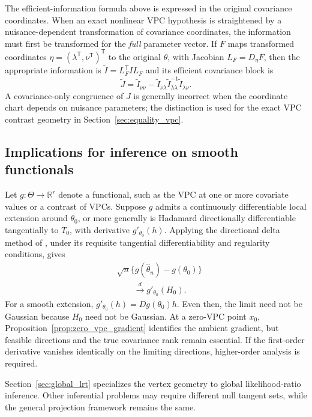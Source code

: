 The efficient-information formula above is expressed in the original
covariance coordinates. When an exact nonlinear VPC hypothesis is
straightened by a nuisance-dependent transformation of covariance
coordinates, the information must first be transformed for the
\emph{full} parameter vector. If $F$ maps transformed coordinates
$\eta=(\lambda^{\mathsf T},\nu^{\mathsf T})^{\mathsf T}$ to the
original $\theta$, with Jacobian $L_F=D_\eta F$, then the appropriate
information is $\widetilde I=L_F^{\mathsf T}I L_F$ and its efficient
covariance block is
\begin{equation}\label{eq:sec4-transformed-efficient-information}
\widetilde J=\widetilde I_{\nu\nu}
-\widetilde I_{\nu\lambda}
 \widetilde I_{\lambda\lambda}^{-1}
 \widetilde I_{\lambda\nu}.
\end{equation}
A covariance-only congruence of $J$ is generally incorrect when the
coordinate chart depends on nuisance parameters; the distinction is
used for the exact VPC contrast geometry in
Section~\ref{sec:equality_vpc}.

\subsection{Implications for inference on smooth functionals}
\label{subsec:functional_asymptotics}

Let $g:\Theta\to\mathbb R^r$ denote a functional,
such as the VPC at one or more covariate values
or a contrast of VPCs. Suppose $g$ admits a
continuously differentiable local extension
around $\theta_0$, or more generally is
Hadamard directionally differentiable
tangentially to $T_0$, with derivative
$g'_{\theta_0}(h)$.
Applying the directional delta method of
\citet{fangsantos2019}, under its requisite
tangential differentiability and regularity
conditions, gives
\begin{equation}
\begin{aligned}
&\sqrt n\{g(\widehat\theta_n)-g(\theta_0)\}\\
&\qquad\xrightarrow{d}g'_{\theta_0}(H_0).
\end{aligned}
\label{eq:sec4-functional-limit}
\end{equation}
For a smooth extension, $g'_{\theta_0}(h)=Dg(\theta_0)h$. Even then, the limit need not be Gaussian because $H_0$ need not be Gaussian. At a zero-VPC point $x_0$, Proposition~\ref{prop:zero_vpc_gradient} identifies the ambient gradient, but feasible directions and the true covariance rank remain essential. If the first-order derivative vanishes identically on the limiting directions, higher-order analysis is required.


Section~\ref{sec:global_lrt} specializes the
vertex geometry to global likelihood-ratio
inference. Other inferential problems may
require different null tangent sets, while
the general projection framework remains the same.
